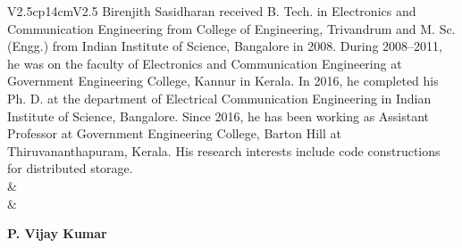 \begin{tabular}{V{2.5}cp{14cm}V{2.5}}
\bigskip
Birenjith Sasidharan received B. Tech. in Electronics and Communication Engineering from College of Engineering, Trivandrum and M. Sc. (Engg.) from Indian Institute of Science, Bangalore in 2008. During 2008–2011, he was on the faculty of Electronics and Communication Engineering at Government Engineering College, Kannur in Kerala. In 2016, he completed his Ph. D. at the department of Electrical Communication Engineering in Indian Institute of Science, Bangalore. Since 2016, he has been working as Assistant Professor at Government Engineering College, Barton Hill at Thiruvananthapuram, Kerala. His research interests include code constructions for distributed storage.\\
&\\  
 & 

\centerline{\large\bf P. Vijay Kumar}


\end{tabular}
